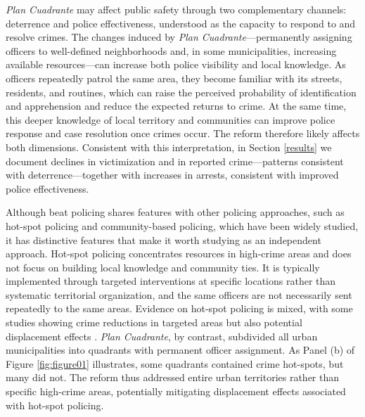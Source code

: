 \emph{Plan Cuadrante} may affect public safety through two complementary channels: deterrence and police effectiveness, understood as the capacity to respond to and resolve crimes. The changes induced by \emph{Plan Cuadrante}---permanently assigning officers to well-defined neighborhoods and, in some municipalities, increasing available resources---can increase both police visibility and local knowledge. As officers repeatedly patrol the same area, they become familiar with its streets, residents, and routines, which can raise the perceived probability of identification and apprehension and reduce the expected returns to crime. At the same time, this deeper knowledge of local territory and communities can improve police response and case resolution once crimes occur. The reform therefore likely affects both dimensions. Consistent with this interpretation, in Section \ref{results} we document declines in victimization and in reported crime---patterns consistent with deterrence---together with increases in arrests, consistent with improved police effectiveness.

Although beat policing shares features with other policing approaches, such as hot-spot policing and community-based policing, which have been widely studied, it has distinctive features that make it worth studying as an independent approach. Hot-spot policing concentrates resources in high-crime areas and does not focus on building local knowledge and community ties. It is typically implemented through targeted interventions at specific locations rather than systematic territorial organization, and the same officers are not necessarily sent repeatedly to the same areas. Evidence on hot-spot policing is mixed, with some studies showing crime reductions in targeted areas but also potential displacement effects \citep{SR_1}. \emph{Plan Cuadrante}, by contrast, subdivided all urban municipalities into quadrants with permanent officer assignment. As Panel (b) of Figure \ref{fig:figure01} illustrates, some quadrants contained crime hot-spots, but many did not. The reform thus addressed entire urban territories rather than specific high-crime areas, potentially mitigating displacement effects associated with hot-spot policing.

